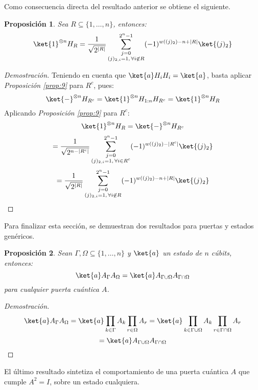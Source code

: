 \documentclass[10pt,conference,a4paper]{IEEEtran}
\newtheorem{prop}{Proposición}[section]
\providecommand{\abs}[1]{\lvert#1\rvert}
\begin{document}
\vspace{1mm}
Como consecuencia directa del resultado anterior se obtiene el siguiente.
\vspace{1mm}
\begin{prop}
    Sea $R\subseteq \{1,\ldots,n\}$, entonces:
	\begin{equation}
		\ket{1}^{\otimes n}H_R = \dfrac{1}{\sqrt{2^{\abs{R}}}}\displaystyle\sum_{\substack{j=0\\ (j)_{2,i}=1, \,\forall i\not\in R}}^{2^n-1}(-1)^{w((j)_2)-n+\abs{R}}\ket{(j)_2}
	\end{equation}
 \label{prop:10}
\end{prop}
\begin{proof}[Demostración] 
    Teniendo en cuenta que $\ket{a}H_i H_i=\ket{a}$, basta aplicar \textit{Proposición \ref{prop:9}} para $R^c$, pues: 
    $$\ket{-}^{\otimes n}H_{R^c}=\ket{1}^{\otimes n}H_{1:n}H_{R^c}=\ket{1}^{\otimes n}H_R$$
    Aplicando \textit{Proposición \ref{prop:9}} para $R^c$:
    $$\ket{1}^{\otimes n}H_R=\ket{-}^{\otimes n}H_{R^c}$$
    $$=\dfrac{1}{\sqrt{2^{n-\abs{R^c}}}}\displaystyle\sum_{\substack{j=0\\ (j)_{2,i}=1, \,\forall i\in R^c}}^{2^n-1}(-1)^{w((j)_2)-\abs{R^c}}\ket{(j)_2}$$
    $$=\dfrac{1}{\sqrt{2^{\abs{R}}}}\displaystyle\sum_{\substack{j=0\\ (j)_{2,i}=1, \,\forall i\not\in R}}^{2^n-1}(-1)^{w((j)_2)-n+\abs{R}}\ket{(j)_2}$$
\end{proof}
\vspace{1mm}
Para finalizar esta sección, se demuestran dos resultados para puertas y estados genéricos.
\vspace{1mm}
\begin{prop}
    Sean $\Gamma, \Omega\subseteq \{1,\ldots, n\}$ y $\ket{a}$ un estado de $n$ cúbits, entonces:
    \begin{equation}
        \ket{a}A_{\Gamma}A_{\Omega}=\ket{a}A_{\Gamma\cup\Omega}A_{\Gamma\cap\Omega}
    \end{equation}
    \label{prop:11}
    para cualquier puerta cuántica $A$.
\end{prop}
\begin{proof}[Demostración] 
    $$\ket{a}A_{\Gamma}A_{\Omega}=\ket{a}\displaystyle\prod_{k\in\Gamma}A_k\prod_{r\in\Omega}A_r=\ket{a}\prod_{k\in\Gamma\cup\Omega}A_k\prod_{r\in\Gamma\cap\Omega}A_r$$
    $$=\ket{a}A_{\Gamma\cup\Omega}A_{\Gamma\cap\Omega}$$
\end{proof}
\vspace{1mm}
El último resultado  sintetiza el comportamiento de una puerta cuántica $A$ que cumple $A^2=I$, sobre un estado cualquiera.
\end{document}
